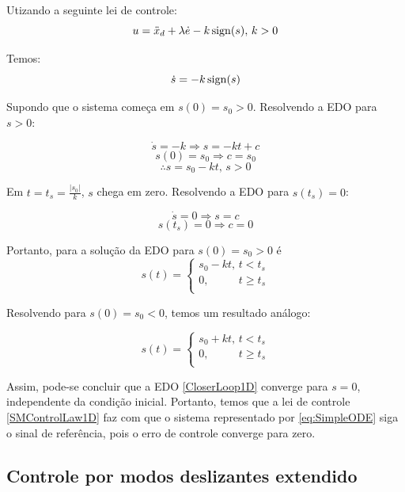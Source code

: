\documentclass[a4paper,11pt,brazil,fleqn]{article}
\begin{document}
Utizando a seguinte lei de controle:
\begin{equation} \label{SMControlLaw1D}
u = \ddot{x}_d + \lambda \dot{e} - k \operatorname*{sign} (s), \, k>0
\end{equation}

Temos:
\begin{equation} \label{CloserLoop1D}
\dot{s} = -k \operatorname*{sign}(s) 
\end{equation}

Supondo que o sistema come\c{c}a em $s(0) = s_0 >0$. Resolvendo a EDO para $s>0$:

$$ \dot{s} = -k \Rightarrow s = -k t + c $$
$$ s(0) = s_0 \Rightarrow c = s_0 $$
$$ \therefore s = s_0 - k t, \, s>0 $$

Em $t = t_s = \frac{|s_0|}{k}$, $s$ chega em zero. Resolvendo a EDO para $s(t_s) = 0$:

$$ \dot{s} = 0 \Rightarrow s =  c $$
$$ s(t_s) = 0 \Rightarrow c = 0 $$

Portanto, para a solu\c{c}\~ao da EDO para $s(0) = s_0 > 0$ \'e
\begin{equation} \label{eq:SM-ODE-Sol1}
s(t) =
\begin{cases}
s_0 - k t, \, t < t_s \\
0, \,\,\,\,\,\,\,\,\,\,\,\,\,\,\,\, t \geq t_s \\
\end{cases}
\end{equation}

Resolvendo para $s(0) = s_0 < 0$, temos um resultado an\'alogo:

\begin{equation} \label{eq:SM-ODE-Sol2}
s(t) =
\begin{cases}
s_0 + k t, \, t < t_s \\
0, \,\,\,\,\,\,\,\,\,\,\,\,\,\,\,\, t \geq t_s \\
\end{cases}
\end{equation}

Assim, pode-se concluir que a EDO \eqref{CloserLoop1D} converge para $s=0$, independente da condi\c{c}\~ao inicial. Portanto, temos que a lei de controle \eqref{SMControlLaw1D} faz com que o sistema representado por \eqref{eq:SimpleODE} siga o sinal de refer\^encia, pois o erro de controle converge para zero.

\subsection{Controle por modos deslizantes extendido}\label{S04-3}
\end{document}
